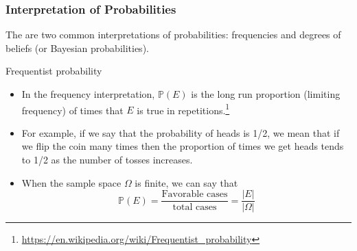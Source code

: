 \documentclass[handout]{beamer}
\begin{document}
\begin{frame}\frametitle{Interpretation of Probabilities}
\begin{scriptsize}

The are two common interpretations of probabilities: frequencies and degrees of beliefs (or Bayesian probabilities).
\begin{block}{Frequentist probability}
\begin{itemize} 
 \item In the frequency interpretation, $\mathbb{P}(E)$ is the long run proportion (limiting frequency) of times that $E$ is true in repetitions.\footnote{\url{https://en.wikipedia.org/wiki/Frequentist_probability}} 
\item For example, if we say that the probability of heads is 1/2, we mean that if we flip the coin many times then the proportion of times we get heads tends to 1/2 as the number of tosses increases. 
\item When the sample space $\Omega$ is finite, we can say that
\begin{displaymath}
 \mathbb{P}(E) = \frac{\text{Favorable cases}}{\text{total cases}} = \frac{|E|}{|\Omega|}
 \end{displaymath}
\end{itemize} 
\end{block}



\end{scriptsize} 

\end{frame}
\end{document}
